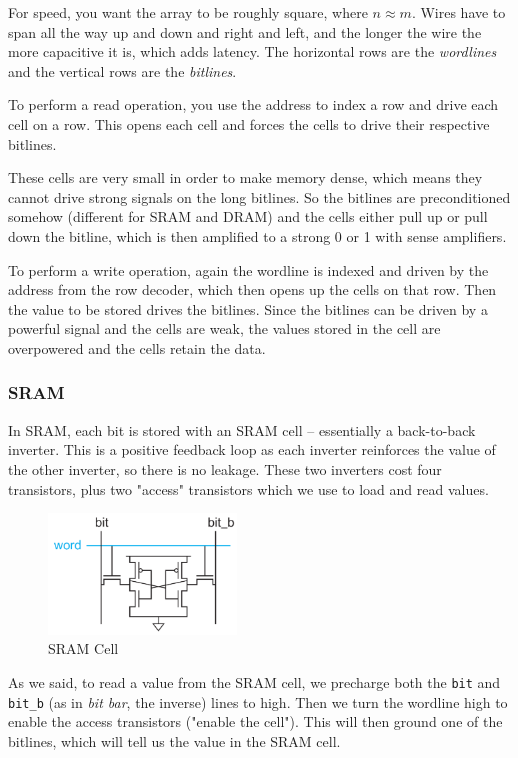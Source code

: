 \documentclass{article}
\begin{document}
For speed, you want the array to be roughly square, where $n \approx m$. Wires have to span all the way up and down and right and left, and the longer the wire the more capacitive it is, which adds latency. The horizontal rows are the \textit{wordlines} and the vertical rows are the \textit{bitlines}. 

To perform a read operation, you use the address to index a row and drive each cell on a row. This opens each cell and forces the cells to drive their respective bitlines. 

These cells are very small in order to make memory dense, which means they cannot drive strong signals on the long bitlines. So the bitlines are preconditioned somehow (different for SRAM and DRAM) and the cells either pull up or pull down the bitline, which is then amplified to a strong 0 or 1 with sense amplifiers.

To perform a write operation, again the wordline is indexed and driven by the address from the row decoder, which then opens up the cells on that row. Then the value to be stored drives the bitlines. Since the bitlines can be driven by a powerful signal and the cells are weak, the values stored in the cell are overpowered and the cells retain the data. 

\subsubsection{SRAM}

In SRAM, each bit is stored with an SRAM cell -- essentially a back-to-back inverter. This is a positive feedback loop as each inverter reinforces the value of the other inverter, so there is no leakage. These two inverters cost four transistors, plus two "access" transistors which we use to load and read values.

\begin{figure}[ht!]
\centering
\includegraphics[width=50mm]{img/SRAM.png}
\caption{SRAM Cell}
\end{figure}

As we said, to read a value from the SRAM cell, we precharge both the \verb|bit| and \verb|bit_b| (as in \textit{bit bar}, the inverse) lines to high. Then we turn the wordline high to enable the access transistors ("enable the cell"). This will then ground one of the bitlines, which will tell us the value in the SRAM cell.
\end{document}
